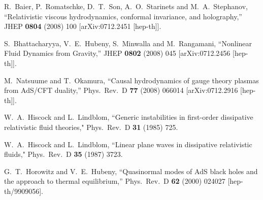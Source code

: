 \begin{thebibliography}{99}
  R.~Baier, P.~Romatschke, D.~T.~Son, A.~O.~Starinets and M.~A.~Stephanov,
  ``Relativistic viscous hydrodynamics, conformal invariance, and holography,''
  JHEP {\bf 0804} (2008) 100
  [arXiv:0712.2451 [hep-th]].

  S.~Bhattacharyya, V.~E.~Hubeny, S.~Minwalla and M.~Rangamani,
  ``Nonlinear Fluid Dynamics from Gravity,''
  JHEP {\bf 0802} (2008) 045
  [arXiv:0712.2456 [hep-th]].

  M.~Natsuume and T.~Okamura,
  ``Causal hydrodynamics of gauge theory plasmas from AdS/CFT duality,''
  Phys.\ Rev.\  D {\bf 77} (2008) 066014
  [arXiv:0712.2916 [hep-th]].


  W.~A.~Hiscock and L.~Lindblom,
  ``Generic instabilities in first-order dissipative relativistic fluid theories,"
  Phys.\ Rev.\ D {\bf 31} (1985) 725.

  W.~A.~Hiscock and L.~Lindblom,
  ``Linear plane waves in dissipative relativistic fluids,"
  Phys.\ Rev.\ D {\bf 35} (1987) 3723.


   

  G.~T.~Horowitz and V.~E.~Hubeny,
  ``Quasinormal modes of AdS black holes and the approach to thermal equilibrium,''
  Phys.\ Rev.\ D {\bf 62} (2000) 024027
  [hep-th/9909056].

\end{thebibliography}
